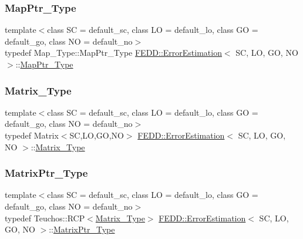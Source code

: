 \subsubsection{\texorpdfstring{Map\+Ptr\+\_\+\+Type}{MapPtr\_Type}}
{\footnotesize\ttfamily template$<$class SC  = default\+\_\+sc, class LO  = default\+\_\+lo, class GO  = default\+\_\+go, class NO  = default\+\_\+no$>$ \\
typedef Map\+\_\+\+Type\+::\+Map\+Ptr\+\_\+\+Type \hyperlink{classFEDD_1_1ErrorEstimation}{F\+E\+D\+D\+::\+Error\+Estimation}$<$ SC, LO, GO, NO $>$\+::\hyperlink{classFEDD_1_1ErrorEstimation_aaa2f9c22726907f5403cdeb0261b67fd}{Map\+Ptr\+\_\+\+Type}}

\mbox{\label{classFEDD_1_1ErrorEstimation_a4c4fef6ebb4e98048a10b84069371e80}} 
\subsubsection{\texorpdfstring{Matrix\+\_\+\+Type}{Matrix\_Type}}
{\footnotesize\ttfamily template$<$class SC  = default\+\_\+sc, class LO  = default\+\_\+lo, class GO  = default\+\_\+go, class NO  = default\+\_\+no$>$ \\
typedef Matrix$<$SC,LO,GO,NO$>$ \hyperlink{classFEDD_1_1ErrorEstimation}{F\+E\+D\+D\+::\+Error\+Estimation}$<$ SC, LO, GO, NO $>$\+::\hyperlink{classFEDD_1_1ErrorEstimation_a4c4fef6ebb4e98048a10b84069371e80}{Matrix\+\_\+\+Type}}

\mbox{\label{classFEDD_1_1ErrorEstimation_a087074cb92827fb21dac83cb1644c244}} 
\subsubsection{\texorpdfstring{Matrix\+Ptr\+\_\+\+Type}{MatrixPtr\_Type}}
{\footnotesize\ttfamily template$<$class SC  = default\+\_\+sc, class LO  = default\+\_\+lo, class GO  = default\+\_\+go, class NO  = default\+\_\+no$>$ \\
typedef Teuchos\+::\+R\+CP$<$\hyperlink{classFEDD_1_1ErrorEstimation_a4c4fef6ebb4e98048a10b84069371e80}{Matrix\+\_\+\+Type}$>$ \hyperlink{classFEDD_1_1ErrorEstimation}{F\+E\+D\+D\+::\+Error\+Estimation}$<$ SC, LO, GO, NO $>$\+::\hyperlink{classFEDD_1_1ErrorEstimation_a087074cb92827fb21dac83cb1644c244}{Matrix\+Ptr\+\_\+\+Type}}

